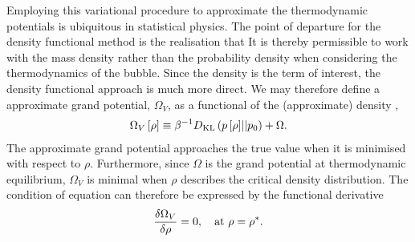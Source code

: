 Employing this variational procedure to approximate the thermodynamic potentials is ubiquitous in statistical physics\cite{Yedidia2000a}.
The point of departure for the density functional method is the realisation that
It is thereby permissible to work with the mass density rather than the probability density when considering the thermodynamics of the bubble.
Since the density is the term of interest, the density functional approach is much more direct.
We may therefore define a approximate grand potential, $\Omega_V$, as a functional of the (approximate) density \cite{Evans1992},
\begin{align}
 \Omega_V\left[ \rho \right] \equiv \beta^{-1}D_{\text {KL}}\left( {p\left[ \rho \right]}||{p_0} \right)+   \Omega. 
\end{align}
The approximate  grand potential approaches the true value when
it is minimised with  respect to $\rho$.
Furthermore, since $\Omega$ is the grand potential at thermodynamic equilibrium,
$\Omega_V$ is minimal when $\rho$ describes the  critical density distribution.
The condition of equation 
can therefore be expressed by the functional derivative\cite{Oxtoby1992}
\begin{align}
  \frac{\delta \Omega_V}{\delta \rho} =0,\quad\text{at $\rho = {\rho^\ast}$.} \label{eqn:DFT:astar}
\end{align}


